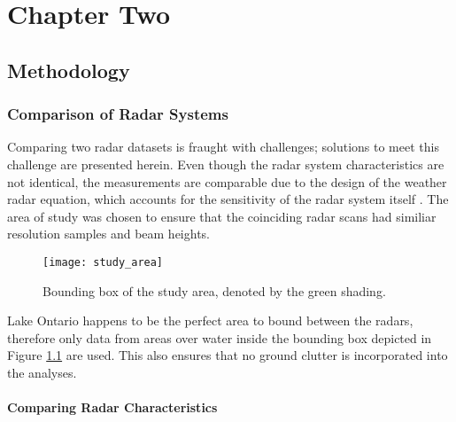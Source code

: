 \chapter{Chapter Two}
\section{Methodology}
\subsection{Comparison of Radar Systems}
Comparing two radar datasets is fraught with challenges; solutions to meet this challenge are presented herein. Even though the radar system characteristics
are not identical, the measurements are comparable due to the design of the weather radar equation, which accounts for the sensitivity of the radar system
itself \citep{Rogers1989}. The area of study was chosen to ensure that the coinciding radar scans had similiar resolution samples and beam heights. 
\begin{figure}[h]
\texttt{[image: study\_area]}\centering
\caption{Bounding box of the study area, denoted by the green shading.} 
\label{fig:study_area}
\end{figure}
Lake Ontario happens to be the perfect area to bound between the radars, therefore only data from areas over water inside the bounding box depicted in Figure
\ref{fig:study_area} are used. This also ensures that no ground clutter is incorporated into the analyses.
\subsubsection{Comparing Radar Characteristics}

